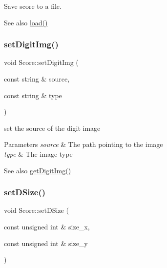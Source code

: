 Save score to a file. 

\begin{DoxySeeAlso}{See also}
\mbox{\hyperlink{class_score_a81abff296ffdfa01fac193c6a3109080}{load()}} 
\end{DoxySeeAlso}
\mbox{\label{class_score_aa832d21b704451b0a1d9f354d1bd1af2}} 
\subsubsection{\texorpdfstring{set\+Digit\+Img()}{setDigitImg()}}
{\footnotesize\ttfamily void Score\+::set\+Digit\+Img (\begin{DoxyParamCaption}\item[{const string \&}]{source,  }\item[{const string \&}]{type }\end{DoxyParamCaption})\hspace{0.3cm}{\ttfamily [inline]}}



set the source of the digit image 


\begin{DoxyParams}{Parameters}
{\em source} & The path pointing to the image \\
\hline
{\em type} & The image type \\
\hline
\end{DoxyParams}
\begin{DoxySeeAlso}{See also}
\mbox{\hyperlink{class_score_ac707716778b5df8de509549441fe9eeb}{get\+Digit\+Img()}} 
\end{DoxySeeAlso}
\mbox{\label{class_score_a86b1e2a967847b148f79504ef7d4e866}} 
\subsubsection{\texorpdfstring{set\+D\+Size()}{setDSize()}}
{\footnotesize\ttfamily void Score\+::set\+D\+Size (\begin{DoxyParamCaption}\item[{const unsigned int \&}]{size\+\_\+x,  }\item[{const unsigned int \&}]{size\+\_\+y }\end{DoxyParamCaption})\hspace{0.3cm}{\ttfamily [inline]}}



